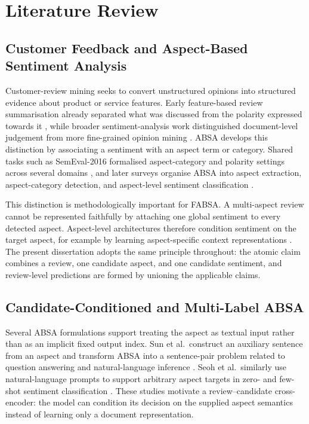 \chapter{Literature Review}

\section{Customer Feedback and Aspect-Based Sentiment Analysis}

Customer-review mining seeks to convert unstructured opinions into structured
evidence about product or service features. Early feature-based review
summarisation already separated what was discussed from the polarity expressed
towards it \cite{hu2004mining}, while broader sentiment-analysis work
distinguished document-level judgement from more fine-grained opinion mining
\cite{pang2008opinion}. ABSA develops this distinction by associating a
sentiment with an aspect term or category. Shared tasks such as SemEval-2016
formalised aspect-category and polarity settings across several domains
\cite{pontiki2016semeval}, and later surveys organise ABSA into aspect
extraction, aspect-category detection, and aspect-level sentiment
classification \cite{zhang2023survey}.

This distinction is methodologically important for FABSA. A multi-aspect review
cannot be represented faithfully by attaching one global sentiment to every
detected aspect. Aspect-level architectures therefore condition sentiment on
the target aspect, for example by learning aspect-specific context
representations \cite{tang2016deep}. The present dissertation adopts the same
principle throughout: the atomic claim combines a review, one candidate aspect,
and one candidate sentiment, and review-level predictions are formed by
unioning the applicable claims.

\section{Candidate-Conditioned and Multi-Label ABSA}

Several ABSA formulations support treating the aspect as textual input rather
than as an implicit fixed output index. Sun et al.\ construct an auxiliary
sentence from an aspect and transform ABSA into a sentence-pair problem related
to question answering and natural-language inference
\cite{sun2019auxiliary}. Seoh et al.\ similarly use natural-language prompts to
support arbitrary aspect targets in zero- and few-shot sentiment classification
\cite{seoh2021open}. These studies motivate a review--candidate cross-encoder:
the model can condition its decision on the supplied aspect semantics instead
of learning only a document representation.

